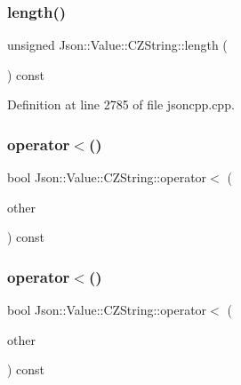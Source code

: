 \hypertarget{class_json_1_1_value_1_1_c_z_string_aa7ee665d162c1f33b3ec818e289d8a5e}{}\label{class_json_1_1_value_1_1_c_z_string_aa7ee665d162c1f33b3ec818e289d8a5e} 
\subsubsection{\texorpdfstring{length()}{length()}\hspace{0.1cm}{\footnotesize\ttfamily [2/2]}}
{\footnotesize\ttfamily unsigned Json\+::\+Value\+::\+C\+Z\+String\+::length (\begin{DoxyParamCaption}{ }\end{DoxyParamCaption}) const}



Definition at line 2785 of file jsoncpp.\+cpp.

\hypertarget{class_json_1_1_value_1_1_c_z_string_ae023bb91b4b4520c82d5e6e4da8c310a}{}\label{class_json_1_1_value_1_1_c_z_string_ae023bb91b4b4520c82d5e6e4da8c310a} 
\subsubsection{\texorpdfstring{operator$<$()}{operator<()}\hspace{0.1cm}{\footnotesize\ttfamily [1/2]}}
{\footnotesize\ttfamily bool Json\+::\+Value\+::\+C\+Z\+String\+::operator$<$ (\begin{DoxyParamCaption}\item[{\hyperlink{class_json_1_1_value_1_1_c_z_string}{C\+Z\+String} const \&}]{other }\end{DoxyParamCaption}) const}

\hypertarget{class_json_1_1_value_1_1_c_z_string_ae023bb91b4b4520c82d5e6e4da8c310a}{}\label{class_json_1_1_value_1_1_c_z_string_ae023bb91b4b4520c82d5e6e4da8c310a} 
\subsubsection{\texorpdfstring{operator$<$()}{operator<()}\hspace{0.1cm}{\footnotesize\ttfamily [2/2]}}
{\footnotesize\ttfamily bool Json\+::\+Value\+::\+C\+Z\+String\+::operator$<$ (\begin{DoxyParamCaption}\item[{\hyperlink{class_json_1_1_value_1_1_c_z_string}{C\+Z\+String} const \&}]{other }\end{DoxyParamCaption}) const}



